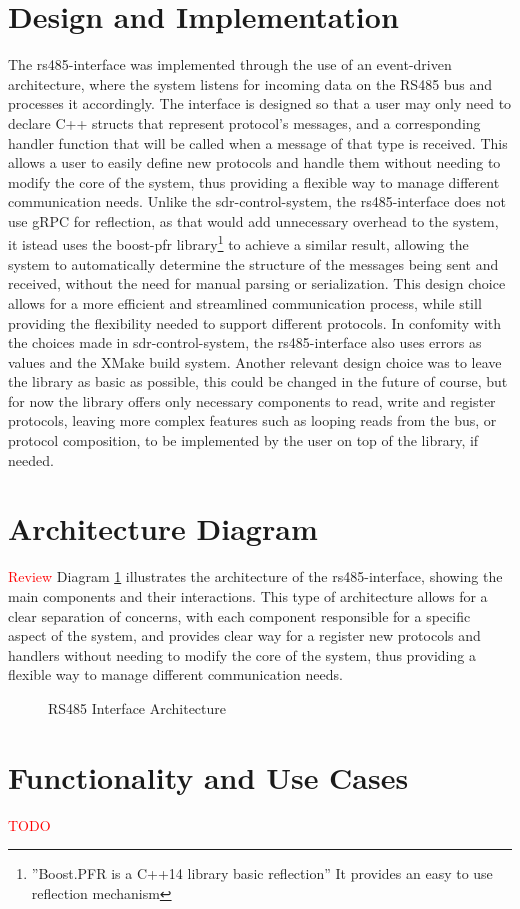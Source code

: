 \section{Design and Implementation}
The \gls{rs485-interface} was implemented through the use of an event-driven
architecture, where the system listens for incoming data on the \gls{RS485} bus
and processes it accordingly. The interface is designed so that a user may only
need to declare C++ structs that represent protocol's messages, and a
corresponding handler function that will be called when a message of that type
is received. This allows a user to easily define new protocols and handle them
without needing to modify the core of the system, thus providing a flexible way
to manage different communication needs. Unlike the \gls{sdr-control-system},
the \gls{rs485-interface} does not use \gls{gRPC} for reflection, as that would
add unnecessary overhead to the system, it istead uses the boost-pfr
library\footnote{''Boost.PFR is a C++14 library basic reflection'' It provides
    an easy to use reflection mechanism\cite{boost-pfr}} to achieve a similar
result, allowing the system to automatically determine the structure of the
messages being sent and received, without the need for manual parsing or
serialization. This design choice allows for a more efficient and streamlined
communication process, while still providing the flexibility needed to support
different protocols. In confomity with the choices made in
\gls{sdr-control-system}, the \gls{rs485-interface} also uses errors as values
and the XMake build system. Another relevant design choice was to leave the
library as basic as possible, this could be changed in the future of course,
but for now the library offers only necessary components to read, write and
register protocols, leaving more complex features such as looping reads from
the bus, or protocol composition, to be implemented by the user on top of the
library, if needed.

\section{Architecture Diagram}
\textcolor{Red}{Review}
Diagram \ref{fig:rs485-interface-architecture} illustrates the architecture of
the \gls{rs485-interface}, showing the main components and their interactions.
This type of architecture allows for a clear separation of concerns, with each
component responsible for a specific aspect of the system, and provides clear
way for a register new protocols and handlers without needing to modify the
core of the system, thus providing a flexible way to manage different
communication needs.

\begin{figure}[htbp]
    \centering
    
    \caption{RS485 Interface Architecture}
    \label{fig:rs485-interface-architecture}
\end{figure}

\section{Functionality and Use Cases}
\textcolor{Red}{TODO}